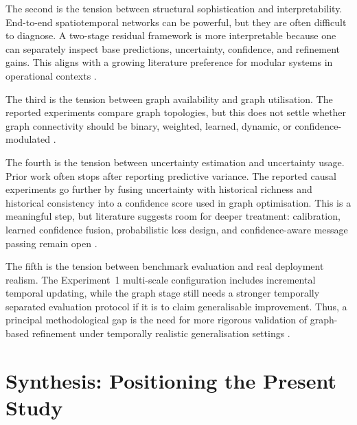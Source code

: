 \documentclass[12pt,a4paper]{report}
\begin{document}
The second is the tension between structural sophistication and interpretability. End-to-end spatiotemporal networks can be powerful, but they are often difficult to diagnose. A two-stage residual framework is more interpretable because one can separately inspect base predictions, uncertainty, confidence, and refinement gains. This aligns with a growing literature preference for modular systems in operational contexts \cite{garcia2023explainability,shao2022d2stgnn}.

The third is the tension between graph availability and graph utilisation. The reported experiments compare graph topologies, but this does not settle whether graph connectivity should be binary, weighted, learned, dynamic, or confidence-modulated \cite{jiang2022survey,wang2024gnnuncertaintysurvey}.

The fourth is the tension between uncertainty estimation and uncertainty usage. Prior work often stops after reporting predictive variance. The reported causal experiments go further by fusing uncertainty with historical richness and historical consistency into a confidence score used in graph optimisation. This is a meaningful step, but literature suggests room for deeper treatment: calibration, learned confidence fusion, probabilistic loss design, and confidence-aware message passing remain open \cite{wang2024probgnn,wang2024gnnuncertaintysurvey}.

The fifth is the tension between benchmark evaluation and real deployment realism. The Experiment~1 multi-scale configuration includes incremental temporal updating, while the graph stage still needs a stronger temporally separated evaluation protocol if it is to claim generalisable improvement. Thus, a principal methodological gap is the need for more rigorous validation of graph-based refinement under temporally realistic generalisation settings \cite{hewamalage2022pitfalls,cerqueira2020evaluating,cavalcante2024review}.

\section{Synthesis: Positioning the Present Study}
\end{document}
